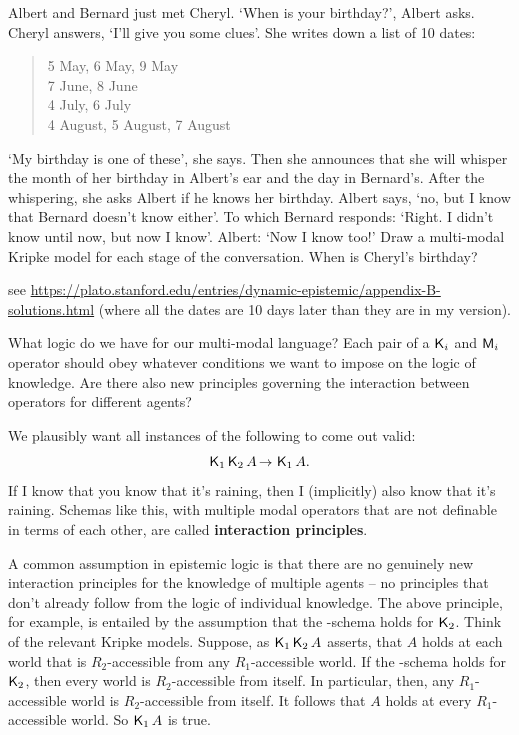 \begin{exercise}
  Albert and Bernard just met Cheryl. `When is your birthday?', Albert asks.
  Cheryl answers, `I'll give you some clues'. She writes down a list of 10
  dates:
  \begin{quote}
    5 May, 6 May, 9 May\\
    7 June, 8 June\\
    4 July, 6 July\\
    4 August, 5 August, 7 August
  \end{quote}
  `My birthday is one of these', she says. Then she announces that she will
  whisper the month of her birthday in Albert's ear and the day in Bernard's.
  After the whispering, she asks Albert if he knows her birthday. Albert says,
  `no, but I know that Bernard doesn't know either'. To which Bernard responds:
  `Right. I didn't know until now, but now I know'. Albert: `Now I know too!'
  Draw a multi-modal Kripke model for each stage of the conversation. When is
  Cheryl's birthday?
\end{exercise}
\begin{solution}
  see
  \href{https://plato.stanford.edu/entries/dynamic-epistemic/appendix-B-solutions.html}{https://plato.stanford.edu/entries/dynamic-epistemic/appendix-B-solutions.html} (where all the dates are 10 days later than they are in my version).
\end{solution}

What logic do we have for our multi-modal language? Each pair of a $\operatorname{\mathsf{K}{}}_{i}$ and
$\operatorname{\mathsf{M}}_{i}$ operator should obey whatever conditions we want to impose on the
logic of knowledge. Are there also new principles governing the interaction
between operators for different agents?

We plausibly want all instances of the following to come out valid:
\[
  \Kn_1 \Kn_2 A \to \Kn_1 A.
\]
If I know that you know that it's raining, then I (implicitly) also know that
it's raining. Schemas like this, with multiple modal operators that are
not definable in terms of each other, are called \textbf{interaction
  principles}.

A common assumption in epistemic logic is that there are no genuinely new
interaction principles for the knowledge of multiple agents -- no principles
that don't already follow from the logic of individual knowledge. The above
principle, for example, is entailed by the assumption that the -schema
holds for $\operatorname{\mathsf{K}{}}_2$. Think of the relevant Kripke models. Suppose, as
$\operatorname{\mathsf{K}{}}_1 \operatorname{\mathsf{K}{}}_2 A$ asserts, that $A$ holds at each world that is $R_2$-accessible
from any $R_1$-accessible world. If the -schema holds for $\operatorname{\mathsf{K}{}}_2$, then
every world is $R_{2}$-accessible from itself. In particular, then, any
$R_1$-accessible world is $R_2$-accessible from itself. It follows that $A$
holds at every $R_1$-accessible world. So $\operatorname{\mathsf{K}{}}_1 A$ is true.

